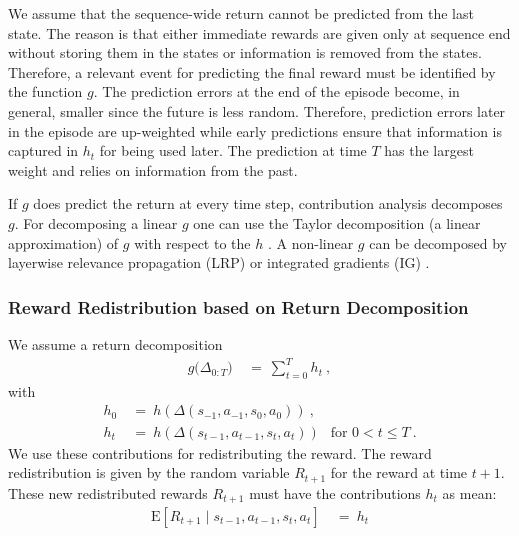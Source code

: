 \documentclass{article}
\newcommand\EXP{\mathbf{\mathrm{E}}}
\renewcommand{\leq}{\leqslant}
\begin{document}
\begin{appendices}
We assume that the sequence-wide return cannot be predicted from the
last state. The reason is that either immediate rewards are given only 
at sequence end without storing them in the states 
or information is removed from the states.
Therefore, a relevant event for predicting the final reward must be identified by
the function $g$. 
The prediction errors at the end of the episode become, in general, smaller since the
future is less random. Therefore, prediction errors later 
in the episode are up-weighted while early predictions ensure that information is
captured in $h_t$ for being used later.
The prediction at time $T$ has the largest weight and 
relies on information from the past.

If $g$ does predict the return at every time step,
contribution analysis decomposes $g$.
For decomposing a linear $g$ one can use the Taylor decomposition 
(a linear approximation) of $g$ with respect to the $h$
\cite{Bach:15,Montavon:17taylor}.
A non-linear $g$ can be decomposed by 
layerwise relevance propagation (LRP)
\cite{Bach:15,Montavon:17} or integrated gradients (IG)
\cite{Sundararajan:17}.


\subsubsection{Reward Redistribution based on Return Decomposition}

We assume a return decomposition
\begin{align}
  g\big(\Delta_{0:T}\big) \ &= \ \sum_{t=0}^T  h_t \ ,
\end{align} 
with
\begin{align}
  h_0 \ &= \ h(\Delta(s_{-1},a_{-1},s_0,a_0)) \ , \\
  h_t \ &= \ h(\Delta(s_{t-1},a_{t-1},s_t,a_t))
   \  \ \text{ for } 0 < t \leq T \ .
\end{align} 
We use these contributions for redistributing the reward. 
The reward redistribution is given by 
the random variable $R_{t+1}$ for the reward at time $t+1$.
These new redistributed rewards
$R_{t+1}$ must have the contributions $h_t$ as mean:
\begin{align}
\EXP \left[ R_{t+1} \mid s_{t-1},a_{t-1},s_t,a_t \right]  \ &=  \ h_t
\end{align} 


\end{appendices}
\end{document}
